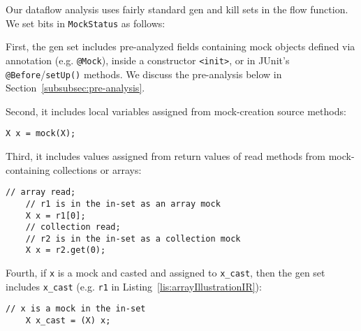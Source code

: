 


Our dataflow analysis uses fairly standard gen and kill sets in the flow function. We set bits in \texttt{MockStatus} as follows:

First, the gen set includes pre-analyzed fields containing mock objects defined via annotation (e.g. \texttt{@Mock}), inside a constructor \texttt{<init>}, or in JUnit's \texttt{@Before}/\texttt{setUp()} methods. We discuss the pre-analysis below in Section~\ref{subsubsec:pre-analysis}. 

Second, it includes local variables assigned from mock-creation source methods:
\begin{lstlisting}[basicstyle=\ttfamily\small,numbers=none]
    X x = mock(X);
\end{lstlisting}

Third, it includes values assigned from return values of read methods from mock-containing collections or arrays:
\begin{lstlisting}[basicstyle=\ttfamily\small,numbers=none]
    // array read;
    // r1 is in the in-set as an array mock
    X x = r1[0];
    // collection read;
    // r2 is in the in-set as a collection mock
    X x = r2.get(0);
\end{lstlisting}

Fourth, if \texttt{x} is a mock and casted and assigned to \texttt{x\_cast}, then the gen set includes \texttt{x\_cast} (e.g. \texttt{r1} in Listing~\ref{lis:arrayIllustrationIR}):
\begin{lstlisting}[basicstyle=\ttfamily\small,numbers=none]
    // x is a mock in the in-set
    X x_cast = (X) x;
\end{lstlisting}

